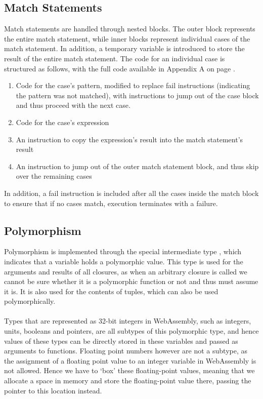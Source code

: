 \subsection{Match Statements}
Match statements are handled through nested blocks. The outer block represents the entire match statement, while inner blocks represent individual cases of the match statement. In addition, a temporary variable is introduced to store the result of the entire match statement. The code for an individual case is structured as follows, with the full code available in Appendix A on page \pageref{sample:transformmatch}.
\begin{enumerate}
\item Code for the case's pattern, modified to replace fail instructions (indicating the pattern was not matched), with instructions to jump out of the case block and thus proceed with the next case.
\item Code for the case's expression
\item An instruction to copy the expression's result into the match statement's result
\item An instruction to jump out of the outer match statement block, and thus skip over the remaining cases
\end{enumerate}
In addition, a fail instruction is included after all the cases inside the match block to ensure that if no cases match, execution terminates with a failure.

\subsection{Polymorphism}
Polymorphism is implemented through the special intermediate type , which indicates that a variable holds a polymorphic value. This type is used for the arguments and results of all closures, as when an arbitrary closure is called we cannot be sure whether it is a polymorphic function or not and thus must assume it is. It is also used for the contents of tuples, which can also be used polymorphically. 
\\\\
Types that are represented as 32-bit integers in WebAssembly, such as integers, units, booleans and pointers, are all subtypes of this polymorphic type, and hence values of these types can be directly stored in these variables and passed as arguments to functions. Floating point numbers however are not a subtype, as the assignment of a floating point value to an integer variable in WebAssembly is not allowed. Hence we have to `box' these floating-point values, meaning that we allocate a space in memory and store the floating-point value there, passing the pointer to this location instead.



